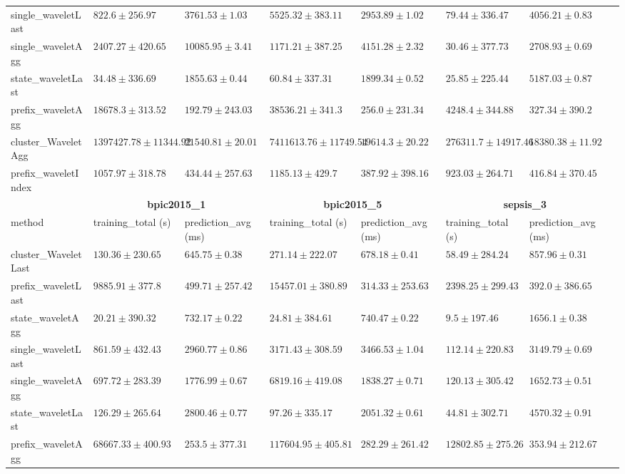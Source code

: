 \documentclass[twoside,11pt]{Latex/Classes/PhDthesisPSnPDF}
\begin{document}
\begin{table}[h]
{\begin{tabular}{llllllll}
		single\_waveletLast & $822.6 \pm 256.97$ & $3761.53 \pm 1.03$ & $5525.32 \pm 383.11$ & $2953.89 \pm 1.02$ & $79.44 \pm 336.47$ & $4056.21 \pm 0.83$ \\ 
		single\_waveletAgg & $2407.27 \pm 420.65$ & $10085.95 \pm 3.41$ & $1171.21 \pm 387.25$ & $4151.28 \pm 2.32$ & $30.46 \pm 377.73$ & $2708.93 \pm 0.69$ \\ 
		state\_waveletLast & $\mathbf{34.48 \pm 336.69}$ & $1855.63 \pm 0.44$ & $\mathbf{60.84 \pm 337.31}$ & $1899.34 \pm 0.52$ & $25.85 \pm 225.44$ & $5187.03 \pm 0.87$ \\ 
		prefix\_waveletAgg & $18678.3 \pm 313.52$ & $\mathbf{192.79 \pm 243.03}$ & $38536.21 \pm 341.3$ & $\mathbf{256.0 \pm 231.34}$ & $4248.4 \pm 344.88$ & $327.34 \pm 390.2$ \\ 
		cluster\_WaveletAgg & $1397427.78 \pm 11344.92$ & $21540.81 \pm 20.01$ & $7411613.76 \pm 11749.54$ & $19614.3 \pm 20.22$ & $276311.7 \pm 14917.46$ & $18380.38 \pm 11.92$ \\ 
		prefix\_waveletIndex & $1057.97 \pm 318.78$ & $434.44 \pm 257.63$ & $1185.13 \pm 429.7$ & $387.92 \pm 398.16$ & $923.03 \pm 264.71$ & $416.84 \pm 370.45$ \\ 
		\bottomrule
		\toprule
		& \multicolumn{2}{c}{{\bfseries bpic2015\_1}} & \multicolumn{2}{c}{{\bfseries bpic2015\_5}} & \multicolumn{2}{c}{{\bfseries sepsis\_3}} \\ \cmidrule(lr){2-3} \cmidrule(lr){4-5} \cmidrule(lr){6-7}
		method  & training\_total (s) & prediction\_avg (ms) & training\_total (s) & prediction\_avg (ms) & training\_total (s) & prediction\_avg (ms) \\ \midrule
		cluster\_WaveletLast & $130.36 \pm 230.65$ & $645.75 \pm 0.38$ & $271.14 \pm 222.07$ & $678.18 \pm 0.41$ & $58.49 \pm 284.24$ & $857.96 \pm 0.31$ \\ 
		prefix\_waveletLast & $9885.91 \pm 377.8$ & $499.71 \pm 257.42$ & $15457.01 \pm 380.89$ & $314.33 \pm 253.63$ & $2398.25 \pm 299.43$ & $392.0 \pm 386.65$ \\ 
		state\_waveletAgg & $\mathbf{20.21 \pm 390.32}$ & $732.17 \pm 0.22$ & $\mathbf{24.81 \pm 384.61}$ & $740.47 \pm 0.22$ & $\mathbf{9.5 \pm 197.46}$ & $1656.1 \pm 0.38$ \\ 
		single\_waveletLast & $861.59 \pm 432.43$ & $2960.77 \pm 0.86$ & $3171.43 \pm 308.59$ & $3466.53 \pm 1.04$ & $112.14 \pm 220.83$ & $3149.79 \pm 0.69$ \\ 
		single\_waveletAgg & $697.72 \pm 283.39$ & $1776.99 \pm 0.67$ & $6819.16 \pm 419.08$ & $1838.27 \pm 0.71$ & $120.13 \pm 305.42$ & $1652.73 \pm 0.51$ \\ 
		state\_waveletLast & $126.29 \pm 265.64$ & $2800.46 \pm 0.77$ & $97.26 \pm 335.17$ & $2051.32 \pm 0.61$ & $44.81 \pm 302.71$ & $4570.32 \pm 0.91$ \\ 
		prefix\_waveletAgg & $68667.33 \pm 400.93$ & $\mathbf{253.5 \pm 377.31}$ & $117604.95 \pm 405.81$ & $\mathbf{282.29 \pm 261.42}$ & $12802.85 \pm 275.26$ & $353.94 \pm 212.67$ \\ 
		

\end{tabular}}
\end{table}
\end{document}
